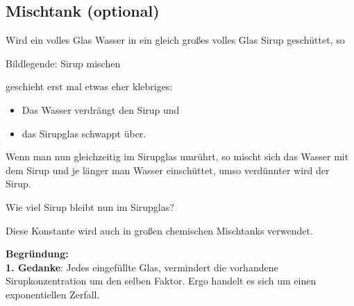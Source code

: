 \subsection{Mischtank (optional)}\label{sirup_beispiel}
Wird ein volles Glas Wasser in ein gleich großes volles Glas Sirup geschüttet, so

\begin{center}{\footnotesize Bildlegende: Sirup mischen}\end{center}

geschieht erst mal etwas eher klebriges:
\begin{itemize}
  \item Das Wasser verdrängt den Sirup und
  \item das Sirupglas schwappt über.
\end{itemize}

Wenn man nun gleichzeitig im Sirupglas
umrührt, so mischt sich das Wasser mit dem Sirup und je länger man
Wasser einschüttet, umso verdünnter wird der Sirup.


Wie viel Sirup bleibt nun im Sirupglas?


Diese Konstante wird auch in großen chemischen Mischtanks verwendet.
\newpage


\textbf{Begründung:}\\
\textbf{1. Gedanke}: Jedes eingefüllte Glas, vermindert die vorhandene
Sirupkonzentration um den selben Faktor. Ergo handelt es sich um
einen exponentiellen Zerfall.

\leserluft

